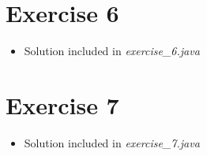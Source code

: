 \documentclass[12pt]{article}
\begin{document}
\bigskip

\section{Exercise 6}

\bigskip

\begin{itemize}
    \item Solution included in \textit{exercise\_6.java}
\end{itemize}

\bigskip

\section{Exercise 7}

\bigskip

\begin{itemize}
    \item Solution included in \textit{exercise\_7.java}
\end{itemize}
\end{document}
